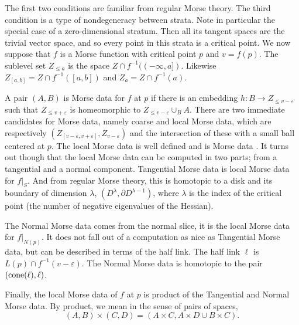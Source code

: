 The first two conditions are familiar from regular Morse theory. The third condition is a type of nondegeneracy between strata. Note in particular the special case of a zero-dimensional stratum. Then all its tangent spaces are the trivial vector space, and so every point in this strata is a critical point. We now suppose that $f$ is a Morse function with critical point $p$ and $v = f(p)$. The sublevel set $Z_{\leq a}$ is the space $Z \cap f^{-1}((-\infty,a])$. Likewise $Z_{[a,b]} = Z \cap f^{-1}([a,b])$ and $Z_a = Z \cap f^{-1}(a)$.

A pair $(A,B)$ is Morse data for $f$ at $p$ if there is an embedding $h : B \to Z_{\leq v-ε}$ such that $Z_{\leq v+ε}$ is homeomorphic to $Z_{\leq v-ε} \cup_B A$. There are two immediate candidates for Morse data, namely coarse and local Morse data, which are respectively $(Z_{[v-ε,v+ε]}, Z_{v-ε})$ and the intersection of these with a small ball centered at $p$. The local Morse data is well defined \cite[Prop 3.5.3]{Goresky1989} and is Morse data \cite[Thm 3.5.4]{Goresky1989}. It turns out though that the local Morse data can be computed in two parts; from a tangential and a normal component. Tangential Morse data is local Morse data for $f|_S$. And from regular Morse theory, this is homotopic to a disk and its boundary of dimension $λ$, $(D^λ, \partial D^{λ-1})$, where $λ$ is the index of the critical point (the number of negative eigenvalues of the Hessian).

The Normal Morse data comes from the normal slice, it is the local Morse data for $f|_{N(p)}$. It does not fall out of a computation as nice as Tangential Morse data, but can be described in terms of the half link. The half link $\ell$ is $L(p) \cap f^{-1}(v-ε)$. The Normal Morse data is homotopic to the pair $({\rm cone} (\ell), \ell)$.

Finally, the local Morse data of $f$ at $p$ is product of the Tangential and Normal Morse data. By product, we mean in the sense of pairs of spaces,
\[
(A,B) \times (C,D) = (A \times C, A \times D \cup B \times C).
\]



